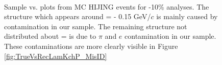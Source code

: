 \documentclass[/home/jesse/Analysis/FemtoAnalysis/AnalysisNotes/AnalysisNoteJBuxton.tex]{subfiles}
\begin{document}
\begin{figure}[h!]
  \centering
  \\
  \caption[Momentum Resolution: Sample \ktrue vs. \krec]{Sample \ktrue vs. \krec plots from MC HIJING events for -10\% analyses.  The structure which appears around \krec = \ktrue - 0.15 GeV/$c$ is mainly caused by \Ks contamination in our \LamALam sample.  The remaining structure not distributed about \krec = \ktrue is due to $\pi$ and $e$ contamination in our \Kpm sample.  These contaminations are more clearly visible in Figure \ref{fig:TrueVsRecLamKchP_MisID}}
  \label{fig:TrueVsRecLamKchP}
\end{figure}
\end{document}
